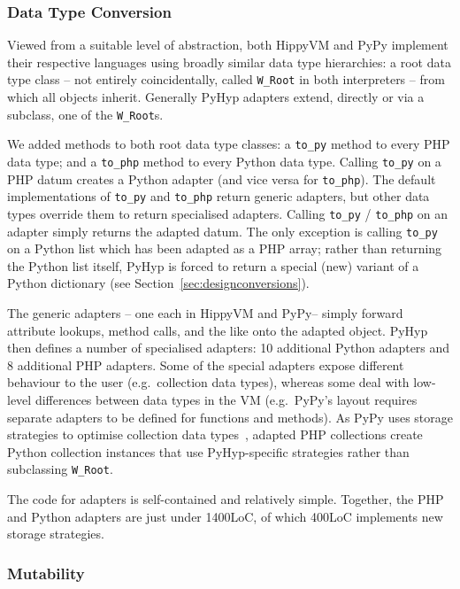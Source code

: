 \documentclass[a4paper,UKenglish]{lipics-v2016}
\newcommand{\ourvm}{PyHyp\xspace}
\newcommand{\hippy}{HippyVM\xspace}
\newcommand{\pypy}{PyPy\xspace}
\begin{document}
\subsubsection{Data Type Conversion}
\label{sec:conversions}

Viewed from a suitable level of abstraction, both \hippy and \pypy implement
their respective languages using broadly similar data type hierarchies: a root
data type class -- not entirely coincidentally, called \texttt{W\_Root} in both
interpreters -- from which all objects inherit.
Generally \ourvm adapters extend, directly or via a subclass,
one of the \texttt{W\_Root}s.

We added methods to both root data type classes: a \texttt{to\_py}
method to every PHP data type; and a \texttt{to\_php} method to every
Python data type. Calling \texttt{to\_py} on a PHP datum creates a Python adapter
(and vice versa for \texttt{to\_php}). The default implementations of
\texttt{to\_py} and \texttt{to\_php} return generic adapters, but other
data types override them to return specialised adapters. Calling \texttt{to\_py}
/ \texttt{to\_php} on an adapter simply returns the adapted datum. The only
exception is calling \texttt{to\_py} on a Python list which has been adapted as
a PHP array; rather than returning the Python list itself, \ourvm is forced to
return a special (new) variant of a Python dictionary (see
Section~\ref{sec:designconversions}).

The generic adapters -- one each in \hippy and \pypy -- simply forward attribute
lookups, method calls, and the
like onto the adapted object. \ourvm then defines a number of specialised
adapters: 10 additional Python adapters and 8 additional PHP adapters. Some of
the special adapters expose different behaviour to the user (e.g.~collection
data types), whereas some deal with low-level differences between
data types in the VM (e.g.~\pypy's layout requires separate adapters to be defined
for functions and methods). As \pypy uses storage strategies to optimise collection
data types~\cite{bolz13strategies}, adapted PHP collections
create Python collection instances that use \ourvm-specific strategies rather than
subclassing \texttt{W\_Root}.

The code for adapters is self-contained and relatively simple. Together, the PHP and
Python adapters are just under 1400LoC, of which 400LoC
implements new storage strategies.


\subsubsection{Mutability}
\end{document}
